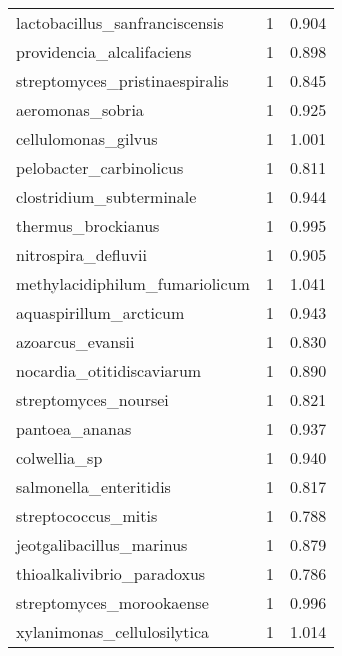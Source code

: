 \begin{tabular}{lrr}
              lactobacillus\_sanfranciscensis &                   1 &     0.904 \\
                   providencia\_alcalifaciens &                   1 &     0.898 \\
              streptomyces\_pristinaespiralis &                   1 &     0.845 \\
                            aeromonas\_sobria &                   1 &     0.925 \\
                         cellulomonas\_gilvus &                   1 &     1.001 \\
                     pelobacter\_carbinolicus &                   1 &     0.811 \\
                    clostridium\_subterminale &                   1 &     0.944 \\
                          thermus\_brockianus &                   1 &     0.995 \\
                         nitrospira\_defluvii &                   1 &     0.905 \\
              methylacidiphilum\_fumariolicum &                   1 &     1.041 \\
                      aquaspirillum\_arcticum &                   1 &     0.943 \\
                            azoarcus\_evansii &                   1 &     0.830 \\
                   nocardia\_otitidiscaviarum &                   1 &     0.890 \\
                        streptomyces\_noursei &                   1 &     0.821 \\
                              pantoea\_ananas &                   1 &     0.937 \\
                                colwellia\_sp &                   1 &     0.940 \\
                      salmonella\_enteritidis &                   1 &     0.817 \\
                         streptococcus\_mitis &                   1 &     0.788 \\
                    jeotgalibacillus\_marinus &                   1 &     0.879 \\
                  thioalkalivibrio\_paradoxus &                   1 &     0.786 \\
                    streptomyces\_morookaense &                   1 &     0.996 \\
                 xylanimonas\_cellulosilytica &                   1 &     1.014 \\

\end{tabular}
